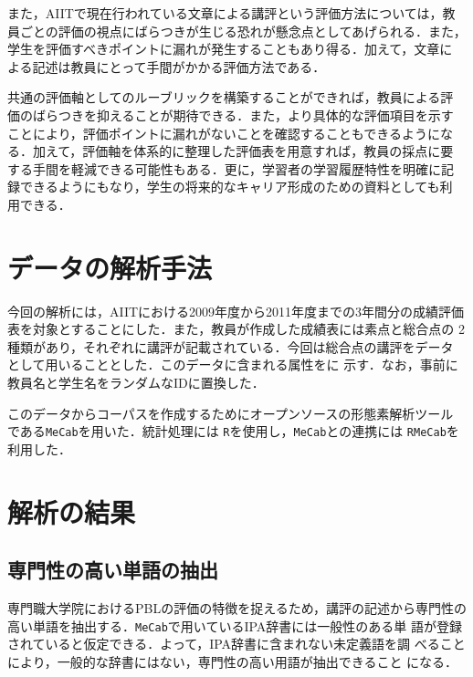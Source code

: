 \documentclass[submit]{ipsj}
\begin{document}
また，AIITで現在行われている文章による講評という評価方法については，教
員ごとの評価の視点にばらつきが生じる恐れが懸念点としてあげられる．また，
学生を評価すべきポイントに漏れが発生することもあり得る．加えて，文章に
よる記述は教員にとって手間がかかる評価方法である．

共通の評価軸としてのルーブリックを構築することができれば，教員による評
価のばらつきを抑えることが期待できる．また，より具体的な評価項目を示す
ことにより，評価ポイントに漏れがないことを確認することもできるようにな
る．加えて，評価軸を体系的に整理した評価表を用意すれば，教員の採点に要
する手間を軽減できる可能性もある．更に，学習者の学習履歴特性を明確に記
録できるようにもなり，学生の将来的なキャリア形成のための資料としても利
用できる\cite{Naohiro2006_1,Naohiro2006_2}．

\section{データの解析手法}\label{sec:解析手法}

今回の解析には，AIITにおける2009年度から2011年度までの3年間分の成績評価
表を対象とすることにした．また，教員が作成した成績表には素点と総合点の
2種類があり，それぞれに講評が記載されている．今回は総合点の講評をデータ
として用いることとした．このデータに含まれる属性をに
示す．なお，事前に教員名と学生名をランダムなIDに置換した．

このデータからコーパスを作成するためにオープンソースの形態素解析ツール
である\texttt{MeCab}\cite{工藤:2004}を用いた．統計処理には
\texttt{R}\cite{R:2012}を使用し，\texttt{MeCab}との連携には
\texttt{RMeCab}\cite{石田:2008}を利用した．


\section{解析の結果}\label{sec:解析結果}

\subsection{専門性の高い単語の抽出}\label{sec:未知語}

専門職大学院におけるPBLの評価の特徴を捉えるため，講評の記述から専門性の
高い単語を抽出する．\texttt{MeCab}で用いているIPA辞書には一般性のある単
語が登録されていると仮定できる．よって，IPA辞書に含まれない未定義語を調
べることにより，一般的な辞書にはない，専門性の高い用語が抽出できること
になる．
\end{document}
